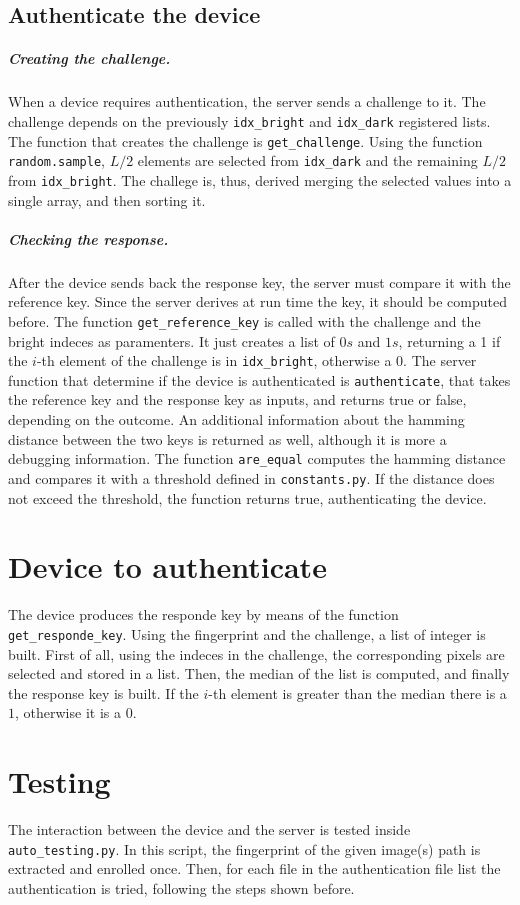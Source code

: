 \begin{enumerate}
        \subsection{Authenticate the device}\label{sec:authdevice}
        \subparagraph{Creating the challenge.}
        When a device requires authentication, the server sends a challenge to it. The challenge depends on the previously \texttt{idx\_bright} and \texttt{idx\_dark} registered lists.
        The function that creates the challenge is \texttt{get\_challenge}. Using the function \texttt{random.sample}, $L/2$ elements are selected from \texttt{idx\_dark} and the remaining $L/2$ from \texttt{idx\_bright}. The challege is, thus, derived merging the selected values into a single array, and then sorting it.

        \subparagraph{Checking the response.}
        After the device sends back the response key, the server must compare it with the reference key. Since the server derives at run time the key, it should be computed before. The function \texttt{get\_reference\_key} is called with the challenge and the bright indeces as paramenters. It just creates a list of $0s$ and $1s$, returning a 1 if the $i$-th element of the challenge is in \texttt{idx\_bright}, otherwise a 0.
        The server function that determine if the device is authenticated is \texttt{authenticate}, that takes the reference key and the response key as inputs, and returns true or false, depending on the outcome. An additional information about the hamming distance between the two keys is returned as well, although it is more a debugging information. The function \texttt{are\_equal} computes the hamming distance and compares it with a threshold defined in \texttt{constants.py}. If the distance does not exceed the threshold, the function returns true, authenticating the device.

        \section{Device to authenticate}\label{sec:device2authenticate}
        The device produces the responde key by means of the function \texttt{get\_responde\_key}. Using the fingerprint and the challenge, a list of integer is built. First of all, using the indeces in the challenge, the corresponding pixels are selected and stored in a list. Then, the median of the list is computed, and finally the response key is built. If the $i$-th element is greater than the median there is a $1$, otherwise it is a $0$.

        \section{Testing}\label{sec:testing}
        The interaction between the device and the server is tested inside \texttt{auto\_testing.py}. In this script, the fingerprint of the given image(s) path is extracted and enrolled once. Then, for each file in the authentication file list the authentication is tried, following the steps shown before.
\end{enumerate}
